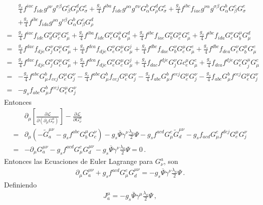 \begin{align}
  &\frac{g_s}{4}f^{iac}f_{ide}g^{\rho\nu}g^{\sigma\beta}G^c_\beta G^d_\rho G^e_\sigma
+\frac{g_s}{4}f^{iba}f_{ide}g^{\rho\alpha}g^{\sigma\nu}G^b_{\alpha}G^d_\rho G^e_\sigma
+\frac{g_s}{4}f^{ibc}f_{iae}g^{\nu\alpha}g^{\sigma\beta}G^b_{\alpha}G^c_\beta G^e_\sigma\nonumber\\
&+\frac{g_s}{4}f^{ibc}f_{ida}g^{\rho\alpha}g^{\nu\beta}G^b_{\alpha}G^c_\beta G^d_\rho\nonumber\\
=&\frac{g_s}{4}f^{iac}f_{ide}G_d^\nu G_c^\mu G^e_\mu
+\frac{g_s}{4}f^{iba}f_{ide}G_e^\nu G_b^{\mu}G^d_\mu
+\frac{g_s}{4}f^{ibc}f_{iae}G_b^{\nu}G_c^\mu G^e_\mu
+\frac{g_s}{4}f^{ibc}f_{ida}G_c^\nu G_b^{\mu}G^d_\mu\nonumber\\
=&  \frac{g_s}{4}f^{dac}f_{dje}G_j^\nu G_c^\mu G^e_\mu
+\frac{g_s}{4}f^{dca}f_{dje}G_e^\nu G_c^{\mu}G^j_\mu
+\frac{g_s}{4}f^{dbc}f_{dae}G_b^{\nu}G_c^\mu G^e_\mu
+\frac{g_s}{4}f^{dbc}f_{dea}G_c^\nu G_b^{\mu}G^e_\mu\nonumber\\
=&  \frac{g_s}{4}f^{dac}f_{dje}G_j^\nu G_c^\mu G^e_\mu
+\frac{g_s}{4}f^{dca}f_{dje}G_e^\nu G_c^{\mu}G^j_\mu
+\frac{g_s}{4}f_{dac}f^{dje}G_j^{\nu}Gc_e^\mu G^c_\mu
+\frac{g_s}{4}f_{dca}f^{dje}G_e^\nu G_j^{\mu}G^c_\mu\nonumber\\
=&  -\frac{g_s}{4}f^{abc}G^b_\mu f_{cej}G_e^\mu G_j^\nu
-\frac{g_s}{4}f^{abc}G^b_{\mu}f_{cej}G_e^\mu G_j^\nu
-\frac{g_s}{4}f_{abc}G^b_\mu f^{cej}G_e^\mu G_j^{\nu}
-\frac{g_s}{4}f_{abc}G^b_\mu f^{cej}G_e^{\mu}G_j^\nu\nonumber\\
=&-g_sf_{abc}G^b_\mu f^{cej}G_e^{\mu}G_j^\nu
\end{align}
Entonces
\begin{align}
    &\partial_\mu\left[\frac{\partial\mathcal{L}}{\partial\left(\partial_\mu G_\nu^a\right)}\right]-\frac{\partial\mathcal{L}}{\partial G_\nu^a}\nonumber\\
    =&\partial_\mu\left(-  \widetilde{G}^{\mu\nu}_a-g_s f^{abc}G_b^\mu G^\nu_c
\right)
-g_s\overline{\Psi}\gamma^\nu\frac{\lambda_a}{2}\Psi
-g_s f^{acd}G^c_\mu\widetilde{G}^{\mu\nu}_d
-g_sf_{acd}G^c_\mu f^{dej}G_e^{\mu}G_j^\nu\nonumber\\
      =&-\partial_\mu{G}^{\mu\nu}_a-g_s f^{acd}G^c_\mu{G}^{\mu\nu}_d
-g_s\overline{\Psi}\gamma^\nu\frac{\lambda_a}{2}\Psi=0\,.
\end{align}
Entonces las Ecuaciones de Euler Lagrange para $G_\nu^a$, son
\begin{align}
\label{eq:Gmuael}
\partial_\mu{G}^{\mu\nu}_a+g_s f^{acd}G^c_\mu{G}^{\mu\nu}_d
=-g_s\overline{\Psi}\gamma^\nu\frac{\lambda_a}{2}\Psi\,.
\end{align}
Definiendo
\begin{align}
J^\mu_a = -g_s\bar{\Psi}\gamma^\mu\frac{\lambda_a}{2}\Psi\,,
\end{align}

